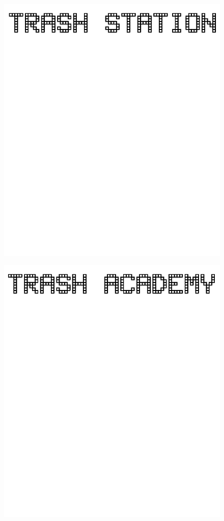 \documentclass[17pt]{extreport}
\begin{document}
	\begin{figure}
		\centering
		\includegraphics[width=6.25in]{imageserver/uploadimages/trashstation.png}
	\end{figure}
	\begin{figure}
		\centering
		\includegraphics[width=6.25in]{imageserver/uploadimages/trashacademy.png}
	\end{figure}
\end{document}
